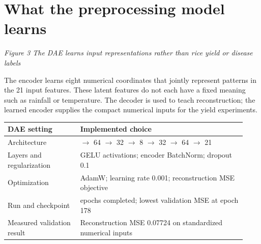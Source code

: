 \documentclass[11pt,a4paper]{article}
\begin{document}
\clearpage\section*{What the preprocessing model learns}
\begin{center}\end{center}
{\footnotesize\itshape Figure 3  The DAE learns input representations rather than rice yield or disease labels}\par
The encoder learns eight numerical coordinates that jointly represent patterns in the 21 input features. These latent features do not each have a fixed meaning such as rainfall or temperature. The decoder is used to teach reconstruction; the learned encoder supplies the compact numerical inputs for the yield experiments.

{\small\renewcommand{\arraystretch}{1.22}\setlength{\tabcolsep}{4pt}\begin{tabular}{>{\raggedright\arraybackslash}p{0.2856\linewidth}>{\raggedright\arraybackslash}p{0.6444\linewidth}}\toprule
\textbf{DAE setting} & \textbf{Implemented choice}\\\midrule
Architecture & 21 $\rightarrow$ 64 $\rightarrow$ 32 $\rightarrow$ 8 $\rightarrow$ 32 $\rightarrow$ 64 $\rightarrow$ 21\\[3pt]
Layers and regularization & GELU activations; encoder BatchNorm; dropout 0.1\\[3pt]
Optimization & AdamW; learning rate 0.001; reconstruction MSE objective\\[3pt]
Run and checkpoint & 180 epochs completed; lowest validation MSE at epoch 178\\[3pt]
Measured validation result & Reconstruction MSE 0.07724 on standardized numerical inputs\\[3pt]
\bottomrule\end{tabular}}\par
\end{document}
